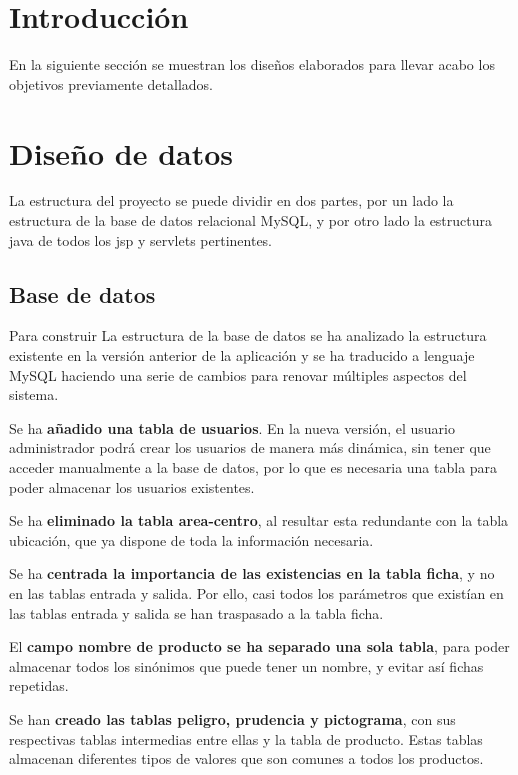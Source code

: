 
\section{Introducción}

En la siguiente sección se muestran los diseños elaborados para llevar acabo los objetivos previamente detallados.

\section{Diseño de datos}

La estructura del proyecto se puede dividir en dos partes, por un lado la estructura de la base de datos relacional MySQL, y por otro lado la estructura java de todos los jsp y servlets pertinentes.

\subsection{Base de datos}

Para construir La estructura de la base de datos se ha analizado la estructura existente en la versión anterior de la aplicación y se ha traducido a lenguaje MySQL haciendo una serie de cambios para renovar múltiples aspectos del sistema.

Se ha \textbf{añadido una tabla de usuarios}. En la nueva versión, el usuario administrador podrá crear los usuarios de manera más dinámica, sin tener que acceder manualmente a la base de datos, por lo que es necesaria una tabla para poder almacenar los usuarios existentes.

Se ha \textbf{eliminado la tabla area-centro}, al resultar esta redundante con la tabla ubicación, que ya dispone de toda la información necesaria.

Se ha \textbf{centrada la importancia de las existencias en la tabla ficha}, y no en las tablas entrada y salida. Por ello, casi todos los parámetros que existían en las tablas entrada y salida se han traspasado a la tabla ficha.

El \textbf{campo nombre de producto se ha separado una sola tabla}, para poder almacenar todos los sinónimos que puede tener un nombre, y evitar así fichas repetidas.

Se han \textbf{creado las tablas peligro, prudencia y pictograma}, con sus respectivas tablas intermedias entre ellas y la tabla de producto. Estas tablas almacenan diferentes tipos de valores que son comunes a todos los productos.

